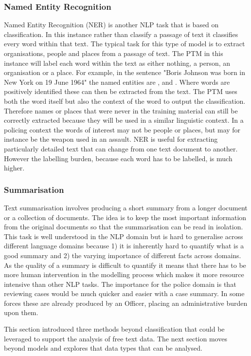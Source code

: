 \subsubsection{Named Entity Recognition} Named Entity Recognition (NER) is another NLP task that is based on classification. In this instance rather than classify a passage of text it classifies every word within that text. The typical task for this type of model is to extract organisations, people and places from a passage of text. The PTM in this instance will label each word within the text as either nothing, a person, an organisation or a place. For example, in the sentence "Boris Johnson was born in New York on 19 June 1964" the named entities are ,  and . Where words are positively identified these can then be extracted from the text. The PTM uses both the word itself but also the context of the word to output the classification. Therefore names or places that were never in the training material can still be correctly extracted because they will be used in a similar linguistic context. In a policing context the words of interest may not be people or places, but may for instance be the weapon used in an assault. NER is useful for extracting particularly detailed text that can change from one text document to another. However the labelling burden, because each word has to be labelled, is much higher.  


\subsubsection{Summarisation} Text summarisation involves producing a short summary from a longer document or a collection of documents. The idea is to keep the most important information from the original documents so that the summarisation can be read in isolation. This task is well understood in the NLP domain but is hard to generalise across different language domains because 1) it is inherently hard to quantify what is a good summary and 2) the varying importance of different facts across domains. As the quality of a summary is difficult to quantify it means that there has to be more human intervention in the modelling process which makes it more resource intensive than other NLP tasks. The importance for the police domain is that reviewing cases would be much quicker and easier with a case summary. In some forces these are already produced by an Officer, placing an administrative burden upon them.

This section introduced three methods beyond classification that could be leveraged to support the analysis of free text data. The next section moves beyond models and explores that data types that can be analysed.  


